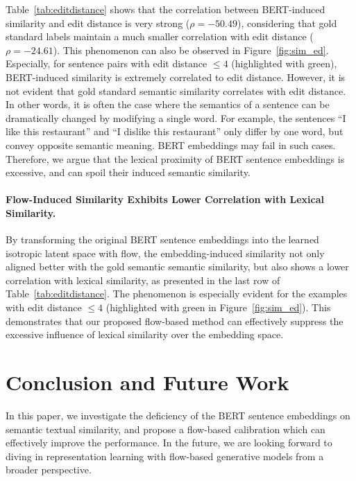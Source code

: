 \documentclass[11pt,a4paper]{article}
\begin{document}
Table~\ref{tab:editdistance} shows that the correlation between BERT-induced similarity and edit distance is very strong ($\rho = -50.49$), considering that gold standard labels maintain a much smaller correlation with edit distance (\textbf{$\rho = -24.61$}). This phenomenon can also be observed in Figure~\ref{fig:sim_ed}. 
Especially, for sentence pairs with edit distance $\leq 4$ (highlighted with {\color{green} green}), BERT-induced similarity is extremely correlated to edit distance. However, it is not evident that gold standard semantic similarity correlates with edit distance. In other words, it is often the case where the semantics of a sentence can be dramatically changed by modifying a single word. For example, the sentences ``I like this restaurant'' and ``I dislike this restaurant'' only differ by one word, but convey opposite semantic meaning. BERT embeddings may fail in such cases. Therefore, we argue that the lexical proximity of BERT sentence embeddings is excessive, and can spoil their induced semantic similarity. 

\paragraph{Flow-Induced Similarity Exhibits Lower Correlation with Lexical Similarity.}
By transforming the original BERT sentence embeddings into the learned isotropic latent space with flow, the embedding-induced similarity not only aligned better with the gold semantic semantic similarity, but also shows a lower correlation with lexical similarity, as presented in the last row of Table~\ref{tab:editdistance}. The phenomenon is especially evident for the examples with edit distance $\leq 4$ (highlighted with {\color{green} green} in Figure~\ref{fig:sim_ed}).
This demonstrates that our proposed flow-based method can effectively suppress the excessive influence of lexical similarity over the embedding space.











 \section{Conclusion and Future Work}
In this paper, we investigate the deficiency of the BERT sentence embeddings on semantic textual similarity, and propose a flow-based calibration which can effectively improve the performance. In the future, we are looking forward to diving in representation learning with flow-based generative models from a broader perspective.
 
\end{document}
